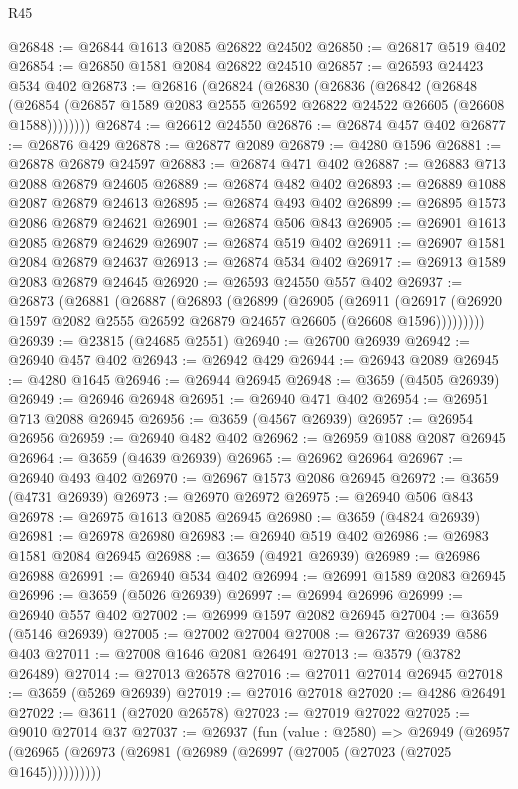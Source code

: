 \begin{lexlean}{R45}
\begin{coremodule}
@26848 := @26844 @1613 @2085 @26822 @24502
@26850 := @26817 @519 @402
@26854 := @26850 @1581 @2084 @26822 @24510
@26857 := @26593 @24423 @534 @402
@26873 := @26816
    (@26824
      (@26830
        (@26836
          (@26842
            (@26848
              (@26854 (@26857 @1589 @2083 @2555 @26592 @26822 @24522 @26605 (@26608 @1588))))))))
@26874 := @26612 @24550
@26876 := @26874 @457 @402
@26877 := @26876 @429
@26878 := @26877 @2089
@26879 := @4280 @1596
@26881 := @26878 @26879 @24597
@26883 := @26874 @471 @402
@26887 := @26883 @713 @2088 @26879 @24605
@26889 := @26874 @482 @402
@26893 := @26889 @1088 @2087 @26879 @24613
@26895 := @26874 @493 @402
@26899 := @26895 @1573 @2086 @26879 @24621
@26901 := @26874 @506 @843
@26905 := @26901 @1613 @2085 @26879 @24629
@26907 := @26874 @519 @402
@26911 := @26907 @1581 @2084 @26879 @24637
@26913 := @26874 @534 @402
@26917 := @26913 @1589 @2083 @26879 @24645
@26920 := @26593 @24550 @557 @402
@26937 := @26873
    (@26881
      (@26887
        (@26893
          (@26899
            (@26905
              (@26911
                (@26917 (@26920 @1597 @2082 @2555 @26592 @26879 @24657 @26605 (@26608 @1596)))))))))
@26939 := @23815 (@24685 @2551)
@26940 := @26700 @26939
@26942 := @26940 @457 @402
@26943 := @26942 @429
@26944 := @26943 @2089
@26945 := @4280 @1645
@26946 := @26944 @26945
@26948 := @3659 (@4505 @26939)
@26949 := @26946 @26948
@26951 := @26940 @471 @402
@26954 := @26951 @713 @2088 @26945
@26956 := @3659 (@4567 @26939)
@26957 := @26954 @26956
@26959 := @26940 @482 @402
@26962 := @26959 @1088 @2087 @26945
@26964 := @3659 (@4639 @26939)
@26965 := @26962 @26964
@26967 := @26940 @493 @402
@26970 := @26967 @1573 @2086 @26945
@26972 := @3659 (@4731 @26939)
@26973 := @26970 @26972
@26975 := @26940 @506 @843
@26978 := @26975 @1613 @2085 @26945
@26980 := @3659 (@4824 @26939)
@26981 := @26978 @26980
@26983 := @26940 @519 @402
@26986 := @26983 @1581 @2084 @26945
@26988 := @3659 (@4921 @26939)
@26989 := @26986 @26988
@26991 := @26940 @534 @402
@26994 := @26991 @1589 @2083 @26945
@26996 := @3659 (@5026 @26939)
@26997 := @26994 @26996
@26999 := @26940 @557 @402
@27002 := @26999 @1597 @2082 @26945
@27004 := @3659 (@5146 @26939)
@27005 := @27002 @27004
@27008 := @26737 @26939 @586 @403
@27011 := @27008 @1646 @2081 @26491
@27013 := @3579 (@3782 @26489)
@27014 := @27013 @26578
@27016 := @27011 @27014 @26945
@27018 := @3659 (@5269 @26939)
@27019 := @27016 @27018
@27020 := @4286 @26491
@27022 := @3611 (@27020 @26578)
@27023 := @27019 @27022
@27025 := @9010 @27014 @37
@27037 := @26937
    (fun (value : @2580) =>
    @26949 (@26957 (@26965 (@26973 (@26981 (@26989 (@26997 (@27005 (@27023 (@27025 @1645))))))))))

\end{coremodule}
\end{lexlean}
